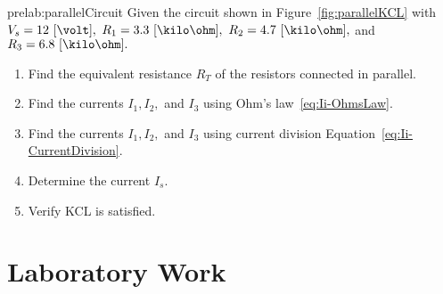 \begin{prelab}{prelab:parallelCircuit}
  Given the circuit shown in Figure~\ref{fig:parallelKCL} with $V_s=12~[\volt],$ $R_1=3.3~[\kilo\ohm],$ $R_2=4.7~[\kilo\ohm],$ and $R_3=6.8~[\kilo\ohm].$ 
     \begin{enumerate}
     \item Find the equivalent resistance $R_T$ of the resistors connected in parallel.
      
         \item Find the currents $I_1,I_2,$ and  $I_3$ using Ohm's law~\eqref{eq:Ii-OhmsLaw}.       
         \item Find the currents $I_1,I_2,$ and  $I_3$ using current division Equation~\eqref{eq:Ii-CurrentDivision}.
         \item Determine the current $I_s.$           
         \item Verify KCL is satisfied.  
         \end{enumerate}
 
       \end{prelab}
       
       
       
           
 
       
\section{Laboratory Work}

